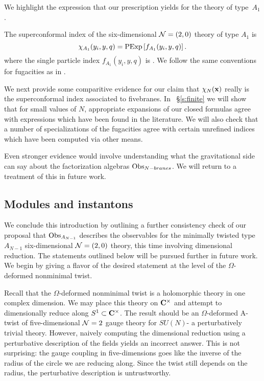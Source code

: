 We highlight the expression that our prescription yields for the theory of type~$A_{1}$.

\begin{conj}\label{conj:6dtwo}
The superconformal index of the six-dimensional $\mathcal N=(2,0)$ theory of type $A_1$ is
\[
\chi_{A_1} (y_i,y,q) = {\rm PExp} \left[f_{A_1}(y_i,y,q) \right] .
\]
where the single particle index $f_{A_1}(y_i,y,q)$ is
\beqn\label{eqn:A1}
.
\eeqn
We follow the same conventions for fugacities as in \cite{Kim:2013nva}.
\end{conj}

We next provide some comparitive evidence for our claim that $\chi_N({\bf x})$ really is the superconformal index associated to fivebranes.
In ~\S\ref{s:finite} we will show that for small values of $N$, appropriate expansions of our closed formulas agree with expressions which have been found in the literature.
We will also check that a number of specializations of the fugacities agree with certain unrefined indices which have been computed via other means.

Even stronger evidence would involve understanding what the gravitational side can say about the factorization algebras $\operatorname{Obs}_{N-branes}$. 
We will return to a treatment of this in future work.

\subsection{Modules and instantons}
We conclude this introduction by outlining a further consistency check of our proposal that $\operatorname{Obs}_{A_{N-1}}$ describes the observables for the minimally twisted type $A_{N-1}$ six-dimensional $\mathcal N=(2,0)$ theory, this time involving dimensional reduction. The statements outlined below will be pursued further in future work. We begin by giving a flavor of the desired statement at the level of the $\Omega$-deformed nonminimal twist.

Recall that the $\Omega$-deformed nonminimal twist is a holomorphic theory in one complex dimension. We may place this theory on $\mathbf{C}^{\times}$ and attempt to dimensionally reduce along $S^{1}\subset \mathbf{C}^{\times}$. The result should be an $\Omega$-deformed A-twist of five-dimensional $\mathcal N =2$ gauge theory for $SU(N)$- a perturbatively trivial theory. However, naively computing the dimensional reduction using a perturbative description of the fields yields an incorrect answer. This is not surprising: the gauge coupling in five-dimensions goes like the inverse of the radius of the circle we are reducing along. Since the twist still depends on the radius, the perturbative description is untrustworthy.

